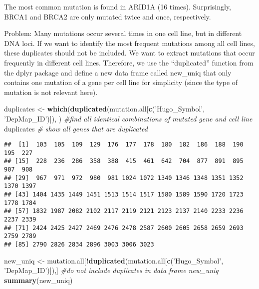 \documentclass[]{article}
\newenvironment{Shaded}{\begin{snugshade}}{\end{snugshade}}
\newcommand{\CommentTok}[1]{\textcolor[rgb]{0.56,0.35,0.01}{\textit{#1}}}
\newcommand{\KeywordTok}[1]{\textcolor[rgb]{0.13,0.29,0.53}{\textbf{#1}}}
\newcommand{\NormalTok}[1]{#1}
\newcommand{\OperatorTok}[1]{\textcolor[rgb]{0.81,0.36,0.00}{\textbf{#1}}}
\newcommand{\StringTok}[1]{\textcolor[rgb]{0.31,0.60,0.02}{#1}}
\begin{document}
The most common mutation is found in ARID1A (16 times). Surprisingly,
BRCA1 and BRCA2 are only mutated twice and once, respectively.

Problem: Many mutations occur several times in one cell line, but in
different DNA loci. If we want to identify the most frequent mutations
among all cell lines, these duplicates should not be included. We want
to extract mutations that occur frequently in different cell lines.
Therefore, we use the ``duplicated'' function from the dplyr package and
define a new data frame called new\_uniq that only contains one mutation
of a gene per cell line for simplicity (since the type of mutation is
not relevant here).

\begin{Shaded}
\begin{Highlighting}[]
\NormalTok{duplicates <-}\StringTok{ }\KeywordTok{which}\NormalTok{(}\KeywordTok{duplicated}\NormalTok{(mutation.all[}\KeywordTok{c}\NormalTok{(}\StringTok{'Hugo_Symbol'}\NormalTok{, }\StringTok{'DepMap_ID'}\NormalTok{)]), ) }\CommentTok{#find all identical combinations of mutated gene and cell line}
\NormalTok{duplicates }\CommentTok{# show all genes that are duplicated}
\end{Highlighting}
\end{Shaded}

\begin{verbatim}
##  [1]  103  105  109  129  176  177  178  180  182  186  188  190  195  227
## [15]  228  236  286  358  388  415  461  642  704  877  891  895  907  908
## [29]  967  971  972  980  981 1024 1072 1340 1346 1348 1351 1352 1370 1397
## [43] 1404 1435 1449 1451 1513 1514 1517 1580 1589 1590 1720 1723 1778 1784
## [57] 1832 1987 2082 2102 2117 2119 2121 2123 2137 2140 2233 2236 2237 2339
## [71] 2424 2425 2427 2469 2476 2478 2587 2600 2605 2658 2659 2693 2759 2789
## [85] 2790 2826 2834 2896 3003 3006 3023
\end{verbatim}

\begin{Shaded}
\begin{Highlighting}[]
\NormalTok{new_uniq <-}\StringTok{ }\NormalTok{mutation.all[}\OperatorTok{!}\KeywordTok{duplicated}\NormalTok{(mutation.all[}\KeywordTok{c}\NormalTok{(}\StringTok{'Hugo_Symbol'}\NormalTok{, }\StringTok{'DepMap_ID'}\NormalTok{)]),] }\CommentTok{#do not include duplicates in data frame new_uniq}
\KeywordTok{summary}\NormalTok{(new_uniq)}
\end{Highlighting}
\end{Shaded}
\end{document}
